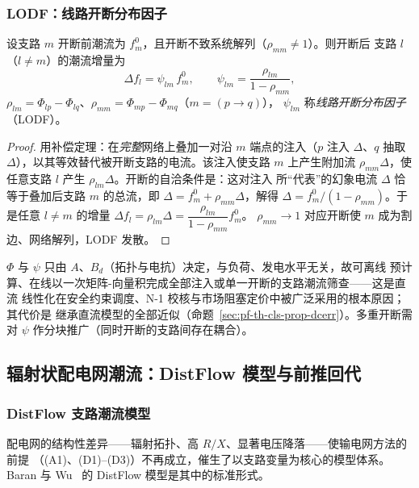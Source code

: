 \subsubsection{LODF：线路开断分布因子}
\begin{theorem}\label{thm:pf-th-cls-lodf}
设支路 $m$ 开断前潮流为 $f_m^0$，且开断不致系统解列（$\rho_{mm}\ne1$）。则开断后
支路 $l$（$l\ne m$）的潮流增量为
\begin{equation}
\Delta f_l=\psi_{lm}\,f_m^0,\qquad
\psi_{lm}=\frac{\rho_{lm}}{1-\rho_{mm}},
\label{sec:pf-th-cls-eq:lodf}
\end{equation}
$\rho_{lm}=\Phi_{lp}-\Phi_{lq}$、$\rho_{mm}=\Phi_{mp}-\Phi_{mq}$（$m=(p\!\to\!q)$），
$\psi_{lm}$ 称\emph{线路开断分布因子}（LODF）。
\end{theorem}
\begin{proof}
用补偿定理：在\emph{完整}网络上叠加一对沿 $m$ 端点的注入（$p$ 注入 $\Delta$、$q$
抽取 $\Delta$），以其等效替代被开断支路的电流。该注入使支路 $m$ 上产生附加流
$\rho_{mm}\Delta$，使任意支路 $l$ 产生 $\rho_{lm}\Delta$。开断的自洽条件是：这对注入
所“代表”的幻象电流 $\Delta$ 恰等于叠加后支路 $m$ 的总流，即
$\Delta=f_m^0+\rho_{mm}\Delta$，解得 $\Delta=f_m^0/(1-\rho_{mm})$。于是任意
$l\ne m$ 的增量 $\Delta f_l=\rho_{lm}\Delta=\dfrac{\rho_{lm}}{1-\rho_{mm}}f_m^0$。
$\rho_{mm}\to1$ 对应开断使 $m$ 成为割边、网络解列，LODF 发散。
\end{proof}

\begin{remark}[拓扑不变性与用途]\label{rem:pf-th-cls-lodf}
$\Phi$ 与 $\psi$ 只由 $A$、$B_d$（拓扑与电抗）决定，与负荷、发电水平无关，故可离线
预计算、在线以一次矩阵-向量积完成全部注入或单一开断的支路潮流筛查——这是直流
线性化在安全约束调度、N-1 校核与市场阻塞定价中被广泛采用的根本原因；其代价是
继承直流模型的全部近似（命题~\ref{sec:pf-th-cls-prop-dcerr}）。多重开断需对
$\psi$ 作分块推广（同时开断的支路间存在耦合）。
\end{remark}

\subsection{辐射状配电网潮流：DistFlow 模型与前推回代}\label{sec:pf-th-cls-distflow}

\subsubsection{DistFlow 支路潮流模型}

配电网的结构性差异——辐射拓扑、高 $R/X$、显著电压降落——使输电网方法的前提
（(A1)、(D1)--(D3)）不再成立，催生了以支路变量为核心的模型体系。
Baran 与 Wu~\cite{cls:baranwu} 的 DistFlow 模型是其中的标准形式。

